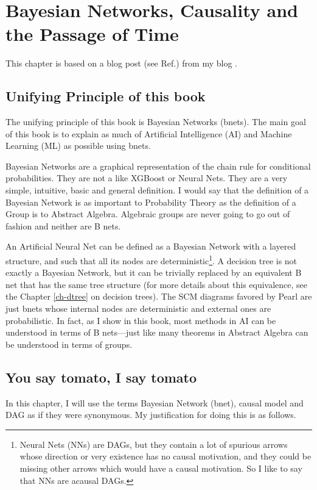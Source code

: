 \chapter{Bayesian Networks, Causality and the
Passage of Time}

\label{ch-bnets-time}

This chapter is based
on a blog post (see Ref.\cite{bnets-passage-time})
from my blog .

\section{Unifying Principle of this book}
The unifying principle of this
book is Bayesian Networks (bnets).
The main goal of this book
is to explain
as much of Artificial Intelligence (AI)
and Machine Learning (ML)
as possible
using bnets.

Bayesian Networks are a graphical representation of the chain rule for
conditional probabilities.
 They are not a  like XGBoost or Neural Nets.
They are a very simple, intuitive, basic and general definition. I would say
that the definition of a Bayesian Network is as important to Probability
Theory as the definition of a Group is to Abstract Algebra. Algebraic groups
are never going to go out of fashion and neither are B nets.

An Artificial Neural Net can be defined as a Bayesian Network with a layered
structure, and such that all its nodes are deterministic\footnote{Neural Nets (NNs)
are DAGs, but they contain a lot of 
spurious arrows whose direction
or very existence has no causal motivation,
and they could be missing
other arrows which 
would have a causal motivation.
 So I like to
say that NNs are acausal DAGs.}. A decision tree
is not exactly a Bayesian Network, but it can be trivially replaced by an
equivalent B net that has the same tree structure (for more details about
this equivalence, see the Chapter \ref{ch-dtree} on decision trees).
The SCM diagrams favored by Pearl are just bnets
whose internal nodes are deterministic and external ones
are probabilistic.
In fact, as I show in this book, most methods in AI can be
understood in terms of B nets---just
like many theorems in Abstract Algebra
can be understood in terms of groups.



\section{You say tomato, I say tomato}
In this chapter, I will use the terms Bayesian Network
(bnet), causal model and DAG as if they were synonymous.
My justification for doing this is as follows.


